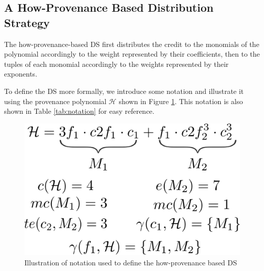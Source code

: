 \documentclass[preprint,12pt,sort&compress]{elsarticle}
\newcommand{\eat}[1]{}
\newcommand{\scream}[1]{{\bf * #1 *}{\typeout{#1}}}
\begin{document}


\subsection{A How-Provenance Based Distribution Strategy}
\label{section:how_prov_distr_tuples}



The how-provenance-based DS first distributes the credit to the monomials of the polynomial accordingly to the weight represented by their coefficients, then to the tuples of each monomial accordingly to the weights represented by their exponents. 

To define the DS more formally, we introduce some notation and illustrate it using the provenance polynomial $\mathcal{H}$ shown in Figure \ref{figure:how_example}. This notation is also shown  in Table \ref{tab:notation} for easy reference.


\begin{figure}[]
\centering
  \includegraphics[width=.4\textwidth]{figures/how_example}
  \caption{Illustration of notation used to define the how-provenance based DS } %
  \label{figure:how_example}
\end{figure}
\end{document}
